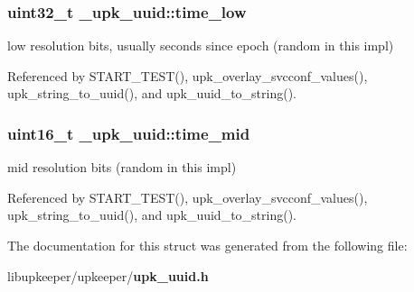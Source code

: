 \subsubsection[{time\_\-low}]{\setlength{\rightskip}{0pt plus 5cm}uint32\_\-t {\bf \_\-upk\_\-uuid::time\_\-low}}\label{struct__upk__uuid_aeefcd7db5971c45ca97b83f724501ca9}
low resolution bits, usually seconds since epoch (random in this impl) 

Referenced by START\_\-TEST(), upk\_\-overlay\_\-svcconf\_\-values(), upk\_\-string\_\-to\_\-uuid(), and upk\_\-uuid\_\-to\_\-string().

\subsubsection[{time\_\-mid}]{\setlength{\rightskip}{0pt plus 5cm}uint16\_\-t {\bf \_\-upk\_\-uuid::time\_\-mid}}\label{struct__upk__uuid_a8f552d485307182b23619be222cd4fc8}
mid resolution bits (random in this impl) 

Referenced by START\_\-TEST(), upk\_\-overlay\_\-svcconf\_\-values(), upk\_\-string\_\-to\_\-uuid(), and upk\_\-uuid\_\-to\_\-string().



The documentation for this struct was generated from the following file:\begin{DoxyCompactItemize}
\item 
libupkeeper/upkeeper/{\bf upk\_\-uuid.h}\end{DoxyCompactItemize}
